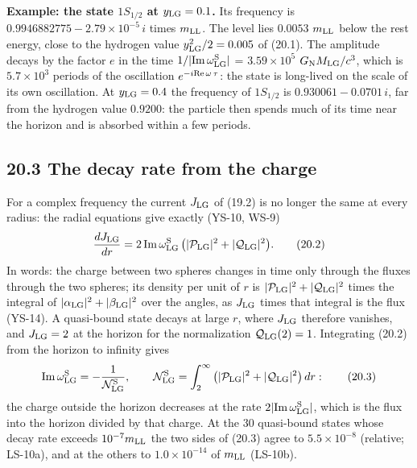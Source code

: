 \documentclass[
  10pt,
]{article}
\begin{document}
\textbf{Example: the state \(1S_{1/2}\) at \(y_{\rm LG}=0.1\).} Its
frequency is \(0.9946882775-2.79\times10^{-5}\,i\) times \(m_{\rm LL}\).
The level lies \(0.0053\) \(m_{\rm LL}\) below the rest energy, close to
the hydrogen value \(y_{\rm LG}^2/2=0.005\) of (20.1). The amplitude
decays by the factor \(e\) in the time
\(1/\lvert{\rm Im}\,\omega^{\rm S}_{\rm LG}\rvert\) =
\(3.59\times10^{5}\) \(G_{\rm N}M_{\rm LG}/c^3\), which is
\(5.7\times10^{3}\) periods of the oscillation
\(e^{-i{\rm Re}\,\omega\,\tau}\): the state is long-lived on the scale
of its own oscillation. At \(y_{\rm LG}=0.4\) the frequency of
\(1S_{1/2}\) is \(0.930061-0.0701\,i\), far from the hydrogen value
\(0.9200\): the particle then spends much of its time near the horizon
and is absorbed within a few periods.

\hypertarget{the-decay-rate-from-the-charge}{%
\subsection{20.3 The decay rate from the
charge}\label{the-decay-rate-from-the-charge}}

For a complex frequency the current \(J_{\rm LG}\) of (19.2) is no
longer the same at every radius: the radial equations give exactly
(YS-10, WS-9)
\[\frac{dJ_{\rm LG}}{dr}=2\,{\rm Im}\,\omega^{\rm S}_{\rm LG}\,\big(\lvert\mathcal P_{\rm LG}\rvert^2+\lvert\mathcal Q_{\rm LG}\rvert^2\big).\tag{20.2}\]
In words: the charge between two spheres changes in time only through
the fluxes through the two spheres; its density per unit of \(r\) is
\(\lvert\mathcal P_{\rm LG}\rvert^2+\lvert\mathcal Q_{\rm LG}\rvert^2\)
times the integral of
\(\lvert\alpha_{\rm LG}\rvert^2+\lvert\beta_{\rm LG}\rvert^2\) over the
angles, as \(J_{\rm LG}\) times that integral is the flux (YS-14). A
quasi-bound state decays at large \(r\), where \(J_{\rm LG}\) therefore
vanishes, and \(J_{\rm LG}=2\) at the horizon for the normalization
\(\mathcal Q_{\rm LG}(2)=1\). Integrating (20.2) from the horizon to
infinity gives
\[{\rm Im}\,\omega^{\rm S}_{\rm LG}=-\frac1{\mathcal N^{\rm S}_{\rm LG}},\qquad\mathcal N^{\rm S}_{\rm LG}=\int_2^\infty\big(\lvert\mathcal P_{\rm LG}\rvert^2+\lvert\mathcal Q_{\rm LG}\rvert^2\big)\,dr:\tag{20.3}\]
the charge outside the horizon decreases at the rate
\(2\lvert{\rm Im}\,\omega^{\rm S}_{\rm LG}\rvert\), which is the flux
into the horizon divided by that charge. At the 30 quasi-bound states
whose decay rate exceeds \(10^{-7}m_{\rm LL}\) the two sides of (20.3)
agree to \(5.5\times10^{-8}\) (relative; LS-10a), and at the others to
\(1.0\times10^{-14}\) of \(m_{\rm LL}\) (LS-10b).
\end{document}
